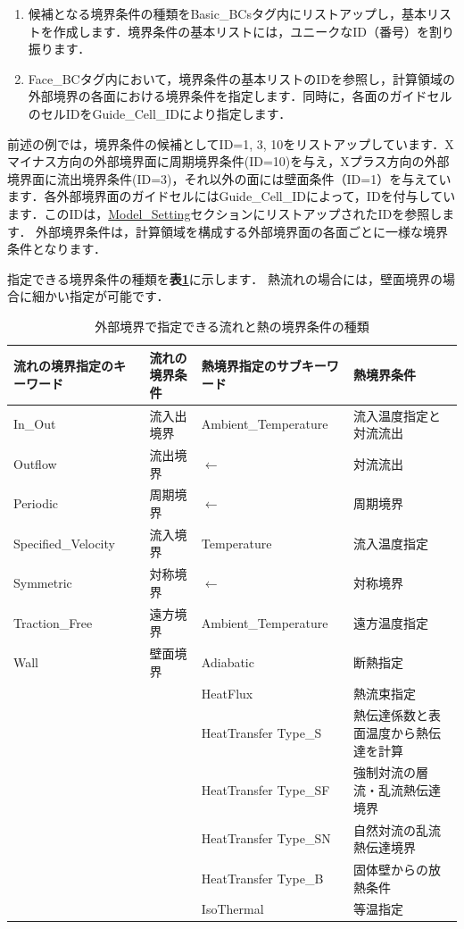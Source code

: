 \begin{enumerate}
\item 候補となる境界条件の種類をBasic\_BCsタグ内にリストアップし，基本リストを作成します．境界条件の基本リストには，ユニークなID（番号）を割り振ります．
\item Face\_BCタグ内において，境界条件の基本リストのIDを参照し，計算領域の外部境界の各面における境界条件を指定します．同時に，各面のガイドセルのセルIDをGuide\_Cell\_IDにより指定します．
\end{enumerate}

前述の例では，境界条件の候補としてID=1, 3, 10をリストアップしています．Xマイナス方向の外部境界面に周期境界条件(ID=10)を与え，Xプラス方向の外部境界面に流出境界条件(ID=3)，それ以外の面には壁面条件（ID=1）を与えています．各外部境界面のガイドセルにはGuide\_Cell\_IDによって，IDを付与しています．このIDは，\hyperlink{tgt:model_setting}{Model\_Setting}セクションにリストアップされたIDを参照します．
外部境界条件は，計算領域を構成する外部境界面の各面ごとに一様な境界条件となります．

指定できる境界条件の種類を\textbf{表\ref{tbl:outer BC physical}}に示します．
熱流れの場合には，壁面境界の場合に細かい指定が可能です．

\begin{table}[htdp]
\caption{外部境界で指定できる流れと熱の境界条件の種類}
\begin{center}
\small
\begin{tabular}{ll|ll} \toprule
流れの境界指定のキーワード &  流れの境界条件 & 熱境界指定のサブキーワード & 熱境界条件\\ \midrule
In\_Out & 流入出境界 & Ambient\_Temperature & 流入温度指定と対流流出\\
Outflow & 流出境界 & $\leftarrow$ & 対流流出\\
Periodic & 周期境界 & $\leftarrow$ & 周期境界\\
Specified\_Velocity & 流入境界 & Temperature & 流入温度指定\\
Symmetric & 対称境界 & $\leftarrow$ & 対称境界\\
Traction\_Free & 遠方境界 & Ambient\_Temperature & 遠方温度指定\\ \hline
Wall & 壁面境界 & Adiabatic & 断熱指定\\
& & HeatFlux & 熱流束指定\\ 
& & HeatTransfer Type\_S & 熱伝達係数と表面温度から熱伝達を計算\\
& & HeatTransfer Type\_SF & 強制対流の層流・乱流熱伝達境界\\
& & HeatTransfer Type\_SN & 自然対流の乱流熱伝達境界\\
& & HeatTransfer Type\_B & 固体壁からの放熱条件\\
& & IsoThermal & 等温指定\\
\bottomrule
\end{tabular}
\end{center}
\label{tbl:outer BC physical}
\end{table}


